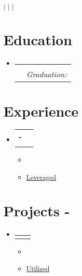 \documentclass[letterpaper,11pt]{article}
\makeatletter
\newcommand{\resumeItem}[1]{
  \item\small{
    {#1 \vspace{-2pt}}
  }
}
\newcommand{\resumeSubheading}[4]{
  \vspace{-2pt}\item
    \begin{tabular*}{0.97\textwidth}[t]{l@{\extracolsep{\fill}}r}
      \textbf{#1} & #2 \\
      \textit{\small#3} & \textit{\small #4} \\
    \end{tabular*}\vspace{-7pt}
}
\newcommand{\resumeProjectHeading}[2]{
    \item
    \begin{tabular*}{0.97\textwidth}{l@{\extracolsep{\fill}}r}
      \small#1 & #2 \\
    \end{tabular*}\vspace{-7pt}
}
\newcommand{\resumeSubHeadingListStart}{\begin{itemize}[leftmargin=0.15in, label={}]}
\newcommand{\resumeSubHeadingListEnd}{\end{itemize}}
\newcommand{\resumeItemListStart}{\begin{itemize}}
\newcommand{\resumeItemListEnd}{\end{itemize}\vspace{-5pt}}
\makeatother
\begin{document}

\begin{center}
    \textbf{\Huge \scshape {}} \\ \vspace{1pt}
    \small {} $|$ \href{mailto:\VAR{contact.email}}{\underline{}} $|$ 
    \href{\VAR{contact.linkedin}}{\underline{}} $|$
    \href{\VAR{contact.repo}}{\underline{}}
\end{center}


\section{Education}
  \resumeSubHeadingListStart
    \resumeSubheading
      {\VAR{school.name}}{\VAR{school.location}}
      {\VAR{school.description}}{Graduation: \VAR{school.graduation}}
  \resumeSubHeadingListEnd


\section{Experience}
  \resumeSubHeadingListStart

    \resumeSubheading
      {\VAR{job.employer} - \VAR{job.title}}{\VAR{job.duration}}
      {\VAR{job.location}}{}
      \resumeItemListStart
        \resumeItem{}
        \resumeItem{\underline{Leveraged} }
      \resumeItemListEnd
      
  \resumeSubHeadingListEnd


\section{Projects - }
    \resumeSubHeadingListStart
      \resumeProjectHeading
          {\textbf{\VAR{project.name}}}{\VAR{project.duration}}
          \resumeItemListStart
            \resumeItem{}
            \resumeItem{\underline{Utilized} }
          \resumeItemListEnd
    \resumeSubHeadingListEnd
\end{document}
